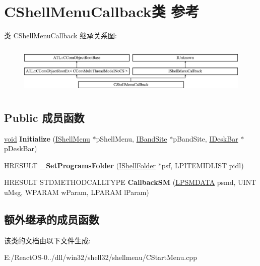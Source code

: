 \hypertarget{class_c_shell_menu_callback}{}\section{C\+Shell\+Menu\+Callback类 参考}
\label{class_c_shell_menu_callback}
类 C\+Shell\+Menu\+Callback 继承关系图\+:\begin{figure}[H]
\begin{center}
\leavevmode
\includegraphics[height=2.386364cm]{class_c_shell_menu_callback}
\end{center}
\end{figure}
\subsection*{Public 成员函数}
\begin{DoxyCompactItemize}
\item 
\mbox{\label{class_c_shell_menu_callback_a3998928465e6c663208078f6f216370c}} 
\hyperlink{interfacevoid}{void} {\bfseries Initialize} (\hyperlink{interface_i_shell_menu}{I\+Shell\+Menu} $\ast$p\+Shell\+Menu, \hyperlink{interface_i_band_site}{I\+Band\+Site} $\ast$p\+Band\+Site, \hyperlink{interface_i_desk_bar}{I\+Desk\+Bar} $\ast$p\+Desk\+Bar)
\item 
\mbox{\label{class_c_shell_menu_callback_ac737412d5b81ac6b0c68c63ee518fea1}} 
H\+R\+E\+S\+U\+LT {\bfseries \+\_\+\+Set\+Programs\+Folder} (\hyperlink{interface_i_shell_folder}{I\+Shell\+Folder} $\ast$psf, L\+P\+I\+T\+E\+M\+I\+D\+L\+I\+ST pidl)
\item 
\mbox{\label{class_c_shell_menu_callback_ade81b70d9731650f6fa4e04852084ca7}} 
H\+R\+E\+S\+U\+LT S\+T\+D\+M\+E\+T\+H\+O\+D\+C\+A\+L\+L\+T\+Y\+PE {\bfseries Callback\+SM} (\hyperlink{structtag_s_m_d_a_t_a}{L\+P\+S\+M\+D\+A\+TA} psmd, U\+I\+NT u\+Msg, W\+P\+A\+R\+AM w\+Param, L\+P\+A\+R\+AM l\+Param)
\end{DoxyCompactItemize}
\subsection*{额外继承的成员函数}


该类的文档由以下文件生成\+:\begin{DoxyCompactItemize}
\item 
E\+:/\+React\+O\+S-\/0../dll/win32/shell32/shellmenu/C\+Start\+Menu.\+cpp\end{DoxyCompactItemize}
